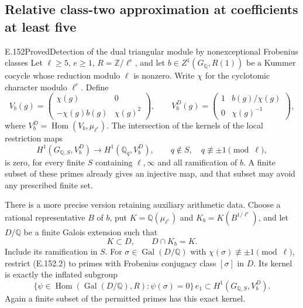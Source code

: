 \subsection{Relative class-two approximation at coefficients at least five}

\begin{result}{E.152}{Proved}{Detection of the dual triangular module by nonexceptional Frobenius classes}
Let \(\ell\ge5\), \(e\ge1\), \(R=\mathbb Z/\ell^e\), and
let \(b\in Z^1(G_{\mathbb Q},R(1))\) be a Kummer cocycle
whose reduction modulo \(\ell\) is nonzero. Write \(\chi\)
for the cyclotomic character modulo \(\ell^e\). Define
\[
 V_b(g)=\begin{pmatrix}\chi(g)&0\\-\chi(g)b(g)&\chi(g)^2\end{pmatrix},
 \qquad
 V_b^D(g)=\begin{pmatrix}1&b(g)/\chi(g)\\0&\chi(g)^{-1}\end{pmatrix},
 \tag{E.152.1}
\]
where \(V_b^D=\operatorname{Hom}(V_b,\mu_{\ell^e})\).
The intersection of the kernels of the local restriction maps
\[
 H^1(G_{\mathbb Q,S},V_b^D)\longrightarrow
 H^1(\mathbb Q_q,V_b^D),\qquad
 q\notin S,\quad q\not\equiv\pm1\pmod\ell,
 \tag{E.152.2}
\]
is zero, for every finite \(S\) containing \(\ell,\infty\)
and all ramification of \(b\).
A finite subset of these primes already gives an injective map,
and that subset may avoid any prescribed finite set.

There is a more precise version retaining auxiliary arithmetic data.
Choose a rational representative \(B\) of \(b\), put
\(K=\mathbb Q(\mu_{\ell^e})\) and
\(K_b=K(B^{1/\ell^e})\), and let \(D/\mathbb Q\) be a finite
Galois extension such that
\[
 K\subset D,\qquad D\cap K_b=K.
 \tag{E.152.3}
\]
Include its ramification in \(S\). For
\(\sigma\in\operatorname{Gal}(D/\mathbb Q)\) with
\(\chi(\sigma)\not\equiv\pm1\pmod\ell\), restrict (E.152.2)
to primes with Frobenius conjugacy class \([\sigma]\) in \(D\).
Its kernel is exactly the inflated subgroup
\[
 \{\psi\in\operatorname{Hom}(\operatorname{Gal}(D/\mathbb Q),R):
                \psi(\sigma)=0\}\,e_1
       \subset H^1(G_{\mathbb Q,S},V_b^D).
 \tag{E.152.4}
\]
Again a finite subset of the permitted primes has this exact kernel.
\end{result}
